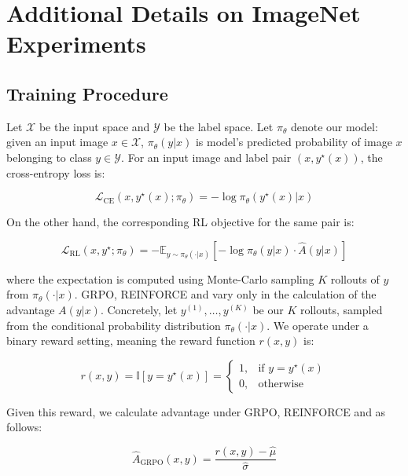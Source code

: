 \documentclass[10pt]{article} %
\begin{document}
\newpage

\section{Additional Details on ImageNet Experiments} \label{app:imagenet}

\subsection{Training Procedure}

Let $\mathcal{X}$ be the input space and $\mathcal{Y}$ be the label space. Let $\pi_\theta$ denote our model: given an input image $x \in \mathcal{X}$, $\pi_\theta(y | x)$ is model's predicted probability of image $x$ belonging to class $y \in \mathcal{Y}$. For an input image and label pair $(x, y^\star(x))$, the cross-entropy loss is:

\begin{equation*}
    \mathcal{L}_\text{CE}(x, y^\star(x); \pi_\theta) = -\log \pi_\theta(y^\star(x)|x)
\end{equation*}

On the other hand, the corresponding RL objective for the same pair is:

\begin{equation*}
    \mathcal{L}_\text{RL}(x, y^\star; \pi_\theta) = -\mathbb{E}_{y \sim \pi_\theta(\cdot|x)}[-\log\pi_\theta(y|x) \cdot \hat{A}(y|x)]
\end{equation*}

where the expectation is computed using Monte-Carlo sampling $K$ rollouts of $y$ from $\pi_\theta(\cdot | x)$. GRPO, REINFORCE and \ours{} vary only in the calculation of the advantage $A(y|x)$. Concretely, let $y^{(1)}, \ldots, y^{(K)}$ be our $K$ rollouts, sampled from the conditional probability distribution $\pi_\theta(\cdot|x)$. We operate under a binary reward setting, meaning the reward function $r(x, y)$ is:

\begin{equation*}
    r(x, y) = \mathbb{I}[y = y^\star(x)] = 
    \begin{cases}
        1, & \text{if } y = y^\star(x) \\
        0, & \text{otherwise}
    \end{cases}
\end{equation*}

Given this reward, we calculate advantage under GRPO, REINFORCE and \ours{} as follows:

\begin{equation*}
    \hat{A}_{\text{GRPO}}(x, y) = \frac{r(x, y) - \hat{\mu}}{\hat{\sigma}}
\end{equation*}
\end{document}
